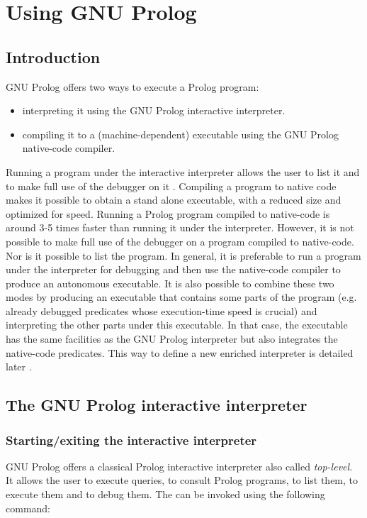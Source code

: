 \newpage
\section{Using GNU Prolog}
\subsection{Introduction}
\label{Introduction:(Using-GNU-Prolog)}
GNU Prolog offers two ways to execute a Prolog program:

\begin{itemize}

\item interpreting it using the GNU Prolog interactive interpreter.

\item compiling it to a (machine-dependent) executable using the GNU Prolog
native-code compiler.

\end{itemize}

Running a program under the interactive interpreter allows the user to
list it and to make full use of the debugger on it .
Compiling a program to native code makes it possible to obtain a stand alone
executable, with a reduced size and optimized for speed. Running a Prolog
program compiled to native-code is around 3-5 times faster than running it
under the interpreter. However, it is not possible to make full use of
the debugger on a program compiled to native-code. Nor is it possible to list
the program. In general, it is preferable to run a program under the
interpreter for debugging and then use the native-code compiler to produce an
autonomous executable. It is also possible to combine these two modes by
producing an executable that contains some parts of the program (e.g.
already debugged predicates whose execution-time speed is crucial) and
interpreting the other parts under this executable. In that case, the
executable has the same facilities as the GNU Prolog interpreter but also
integrates the native-code predicates. This way to define a new enriched
interpreter is detailed later .

\subsection{The GNU Prolog interactive interpreter}
\label{The-GNU-Prolog-interactive-interpreter}

\subsubsection{Starting/exiting the interactive interpreter}
GNU Prolog offers a classical Prolog interactive interpreter also called
\emph{top-level}. It allows the user to execute queries, to consult Prolog
programs, to list them, to execute them and to debug them. The
 can be invoked using the following command:


